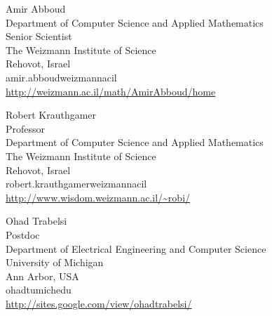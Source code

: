 \documentclass{toc}
\theoremstyle{plain}
\begin{document}
%
%
%
%
%
\begin{tocauthors}
\begin{tocinfo}[abboud]
 Amir Abboud\\
  Department of Computer Science and Applied Mathematics\\
%
  Senior Scientist\\  %
  The Weizmann Institute of Science\\
  Rehovot, Israel\\  %
  amir.abboud\tocat{}weizmann\tocdot{}ac\tocdot{}il \\
 \url{http://weizmann.ac.il/math/AmirAbboud/home}      %
\end{tocinfo}
\begin{tocinfo}[krauthgamer]
  Robert Krauthgamer\\
  Professor\\        %
  Department of Computer Science and Applied Mathematics\\
  The Weizmann Institute of Science\\
  Rehovot, Israel\\ %
  robert.krauthgamer\tocat{}weizmann\tocdot{}ac\tocdot{}il \\
  \url{http://www.wisdom.weizmann.ac.il/~robi/}
\end{tocinfo}
\begin{tocinfo}[trabelsi]
  Ohad Trabelsi\\
  Postdoc\\            %
  Department of Electrical Engineering and Computer Science\\
  University of Michigan\\
  Ann Arbor, USA\\
  ohadt\tocat{}umich\tocdot{}edu \\
  \url{http://sites.google.com/view/ohadtrabelsi/}
\end{tocinfo}
\end{tocauthors}
\end{document}
